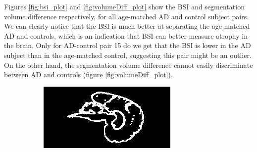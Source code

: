 \documentclass[11pt,a4paper,oneside]{report}
\begin{document}
Figures \ref{fig:bsi_plot} and \ref{fig:volumeDiff_plot} show the BSI and segmentation volume difference respectively, for all age-matched AD and control subject pairs. We can clearly notice that the BSI is much better at separating the age-matched AD and controls, which is an indication that BSI can better measure atrophy in the brain. Only for AD-control pair 15 do we get that the BSI is lower in the AD subject than in the age-matched control, suggesting this pair might be an outlier. On the other hand, the segmentation volume difference cannot easily discriminate between AD and controls (figure \ref{fig:volumeDiff_plot}).

\begin{figure}[H]
        \centering
        \begin{subfigure}[b]{0.3\textwidth}
                \includegraphics[width=\textwidth, height=0.8\textwidth, angle=90]{figures/diff/bsiBoundary_x.jpg}
        \end{subfigure}%
        \begin{subfigure}[b]{0.3\textwidth}

\end{subfigure}
\end{figure}
\end{document}
